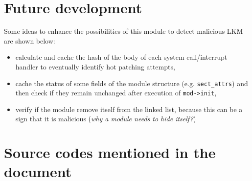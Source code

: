 \documentclass{article}
\begin{document}
	\section{Future development}
	Some ideas to enhance the possibilities of this module to detect malicious LKM are shown below:
	\begin{itemize}
		\item calculate and cache the hash of the body of each system call/interrupt handler to eventually identify hot
		patching attempts,
		\item cache the status of some fields of the module structure (e.g. \texttt{sect\_attrs}) and then check if
		they remain unchanged after execution of \texttt{mod->init},
		\item verify if the module remove itself from the linked list, because this can be a sign that it is
		malicious (\textit{why a module needs to hide itself?})
	\end{itemize}

	\section{Source codes mentioned in the document}
	

	

	

	

	

	
\end{document}
